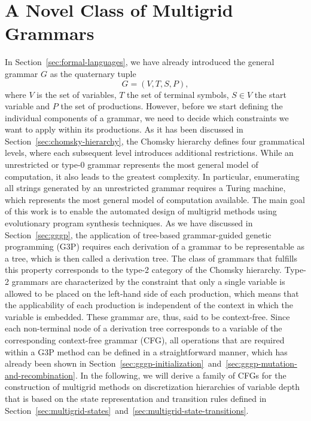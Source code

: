 \section{A Novel Class of Multigrid Grammars}
\label{sec:multigrid-grammar}
In Section~\ref{sec:formal-languages}, we have already introduced the general grammar $G$ as the quaternary tuple 
\begin{equation*}
	G = \left(V, T, S, P \right),
\end{equation*}
where $V$ is the set of variables, $T$ the set of terminal symbols, $S \in V$ the start variable and $P$ the set of productions.
However, before we start defining the individual components of a grammar, we need to decide which constraints we want to apply within its productions.
As it has been discussed in Section~\ref{sec:chomsky-hierarchy}, the Chomsky hierarchy defines four grammatical levels, where each subsequent level introduces additional restrictions.
While an unrestricted or type-0 grammar represents the most general model of computation, it also leads to the greatest complexity.
In particular, enumerating all strings generated by an unrestricted grammar requires a Turing machine, which represents the most general model of computation available.
The main goal of this work is to enable the automated design of multigrid methods using evolutionary program synthesis techniques.
As we have discussed in Section~\ref{sec:gggp}, the application of tree-based grammar-guided genetic programming (G3P) requires each derivation of a grammar to be representable as a tree, which is then called a derivation tree.
The class of grammars that fulfills this property corresponds to the type-2 category of the Chomsky hierarchy.
Type-2 grammars are characterized by the constraint that only a single variable is allowed to be placed on the left-hand side of each production, which means that the applicability of each production is independent of the context in which the variable is embedded. 
These grammar are, thus, said to be context-free.
Since each non-terminal node of a derivation tree corresponds to a variable of the corresponding context-free grammar (CFG), all operations that are required within a G3P method can be defined in a straightforward manner, which has already been shown in Section~\ref{sec:gggp-initialization}~and~\ref{sec:gggp-mutation-and-recombination}.
In the following, we will derive a family of CFGs for the construction of multigrid methods on discretization hierarchies of variable depth that is based on the state representation and transition rules defined in Section~\ref{sec:multigrid-states}~and~\ref{sec:multigrid-state-transitions}.
